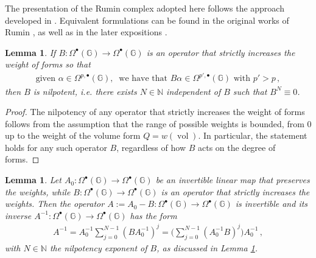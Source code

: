 \documentclass[dvipsnames]{amsart}
\newtheorem{lemma}[theorem]{Lemma}
\theoremstyle{definition}
\theoremstyle{definition}
\numberwithin{equation}{section}
\newcommand{\N}{\mathbb{N}}
\newcommand{\G}{\mathbb{G}}
\begin{document}
The presentation of the Rumin complex adopted here follows the approach developed in \cite{F+T1}. Equivalent formulations can be found in the original works of Rumin \cite{rumin1999differential,rumin_grenoble,rumin_palermo}, as well as in the later expositions \cite{CompensatedCompactness,FranchiTesi,FT}.
\begin{lemma}\label{lem: stricly increasing weights implies nilpotent} If $B\colon\Omega^{\bullet}(\G)\to\Omega^\bullet(\G)$ is an operator that strictly increases the weight of forms so that
\begin{align*}
    \text{given }\alpha\in\Omega^{p,\bullet}(\G),\ \text{ we have that }B\alpha\in\Omega^{p',\bullet}(\G)\text{ with }p'>p\,,
\end{align*}
then $B$ is nilpotent, i.e. there exists $N\in\N$ independent of $B$ such that $B^N\equiv 0$.
\end{lemma}
\begin{proof}
    The nilpotency of any operator that strictly increases the weight of forms follows from the assumption that the range of possible weights is bounded, from 0 up to the weight of the volume form $Q=w(\operatorname{vol})$. In particular, the statement holds for any such operator $B$, regardless of how $B$ acts on the degree of forms.
\end{proof}
\begin{lemma}\label{lem: inverting nilpotent operators}
    Let $A_0\colon\Omega^\bullet(\G)\to\Omega^\bullet(\G)$ be an invertible linear map that preserves the weights, while $B\colon\Omega^\bullet(\G)\to\Omega^\bullet(\G)$ is an operator that strictly increases the weights. Then the operator $A:=A_0-B\colon\Omega^\bullet(\G)\to\Omega^\bullet(\G)$ is invertible and its inverse $A^{-1}\colon\Omega^\bullet(\G)\to\Omega^\bullet(\G)$ has the form
    \begin{align*}
        A^{-1}=A_0^{-1}\sum_{j=0}^{N-1}\left(BA_0^{-1}\right)^j=\bigg(\sum_{j=0}^{N-1}\left(A_0^{-1}B\right)^j\bigg)A_0^{-1}\,,
    \end{align*}
    with $N\in\N$ the nilpotency exponent of $B$, as discussed in Lemma \ref{lem: stricly increasing weights implies nilpotent}.
\end{lemma}
\end{document}

